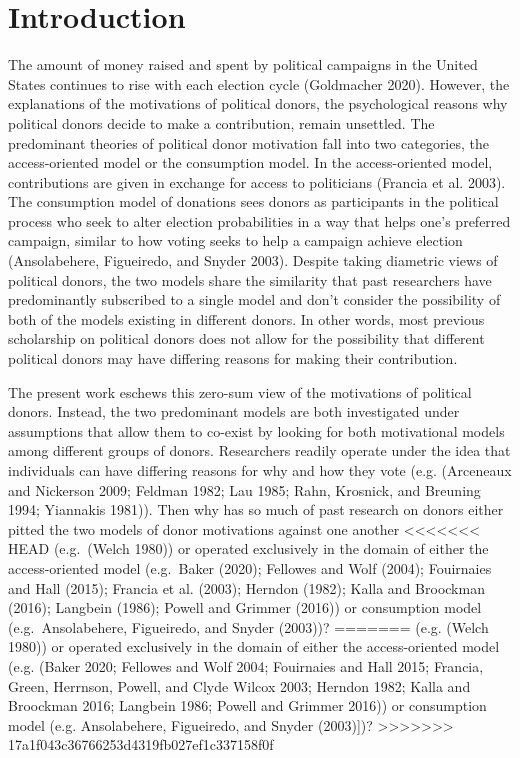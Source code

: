 \documentclass[12pt,]{article}
\begin{document}
\newpage

\hypertarget{introduction}{%
\section{Introduction}\label{introduction}}

The amount of money raised and spent by political campaigns in the
United States continues to rise with each election cycle (Goldmacher
2020). However, the explanations of the motivations of political donors,
the psychological reasons why political donors decide to make a
contribution, remain unsettled. The predominant theories of political
donor motivation fall into two categories, the access-oriented model or
the consumption model. In the access-oriented model, contributions are
given in exchange for access to politicians (Francia et al. 2003). The
consumption model of donations sees donors as participants in the
political process who seek to alter election probabilities in a way that
helps one's preferred campaign, similar to how voting seeks to help a
campaign achieve election (Ansolabehere, Figueiredo, and Snyder 2003).
Despite taking diametric views of political donors, the two models share
the similarity that past researchers have predominantly subscribed to a
single model and don't consider the possibility of both of the models
existing in different donors. In other words, most previous scholarship
on political donors does not allow for the possibility that different
political donors may have differing reasons for making their
contribution.

The present work eschews this zero-sum view of the motivations of
political donors. Instead, the two predominant models are both
investigated under assumptions that allow them to co-exist by looking
for both motivational models among different groups of donors.
Researchers readily operate under the idea that individuals can have
differing reasons for why and how they vote (e.g. (Arceneaux and
Nickerson 2009; Feldman 1982; Lau 1985; Rahn, Krosnick, and Breuning
1994; Yiannakis 1981)). Then why has so much of past research on donors
either pitted the two models of donor motivations against one another
<<<<<<< HEAD
(e.g.~(Welch 1980)) or operated exclusively in the domain of either the
access-oriented model (e.g.~Baker (2020); Fellowes and Wolf (2004);
Fouirnaies and Hall (2015); Francia et al. (2003); Herndon (1982); Kalla
and Broockman (2016); Langbein (1986); Powell and Grimmer (2016)) or
consumption model (e.g.~Ansolabehere, Figueiredo, and Snyder (2003))?
=======
(e.g. (Welch 1980)) or operated exclusively in the domain of either the
access-oriented model (e.g. (Baker 2020; Fellowes and Wolf 2004;
Fouirnaies and Hall 2015; Francia, Green, Herrnson, Powell, and Clyde
Wilcox 2003; Herndon 1982; Kalla and Broockman 2016; Langbein 1986;
Powell and Grimmer 2016)) or consumption model (e.g. Ansolabehere,
Figueiredo, and Snyder (2003){]})?
>>>>>>> 17a1f043c36766253d4319fb027ef1c337158f0f
\end{document}
